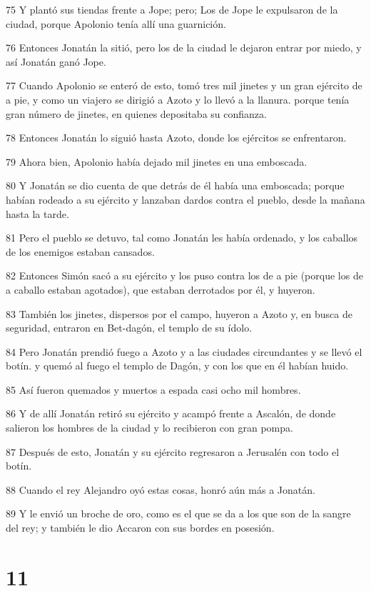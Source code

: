 \par 75 Y plantó sus tiendas frente a Jope; pero; Los de Jope le expulsaron de la ciudad, porque Apolonio tenía allí una guarnición.
\par 76 Entonces Jonatán la sitió, pero los de la ciudad le dejaron entrar por miedo, y así Jonatán ganó Jope.
\par 77 Cuando Apolonio se enteró de esto, tomó tres mil jinetes y un gran ejército de a pie, y como un viajero se dirigió a Azoto y lo llevó a la llanura. porque tenía gran número de jinetes, en quienes depositaba su confianza.
\par 78 Entonces Jonatán lo siguió hasta Azoto, donde los ejércitos se enfrentaron.
\par 79 Ahora bien, Apolonio había dejado mil jinetes en una emboscada.
\par 80 Y Jonatán se dio cuenta de que detrás de él había una emboscada; porque habían rodeado a su ejército y lanzaban dardos contra el pueblo, desde la mañana hasta la tarde.
\par 81 Pero el pueblo se detuvo, tal como Jonatán les había ordenado, y los caballos de los enemigos estaban cansados.
\par 82 Entonces Simón sacó a su ejército y los puso contra los de a pie (porque los de a caballo estaban agotados), que estaban derrotados por él, y huyeron.
\par 83 También los jinetes, dispersos por el campo, huyeron a Azoto y, en busca de seguridad, entraron en Bet-dagón, el templo de su ídolo.
\par 84 Pero Jonatán prendió fuego a Azoto y a las ciudades circundantes y se llevó el botín. y quemó al fuego el templo de Dagón, y con los que en él habían huido.
\par 85 Así fueron quemados y muertos a espada casi ocho mil hombres.
\par 86 Y de allí Jonatán retiró su ejército y acampó frente a Ascalón, de donde salieron los hombres de la ciudad y lo recibieron con gran pompa.
\par 87 Después de esto, Jonatán y su ejército regresaron a Jerusalén con todo el botín.
\par 88 Cuando el rey Alejandro oyó estas cosas, honró aún más a Jonatán.
\par 89 Y le envió un broche de oro, como es el que se da a los que son de la sangre del rey; y también le dio Accaron con sus bordes en posesión.

\chapter{11}

